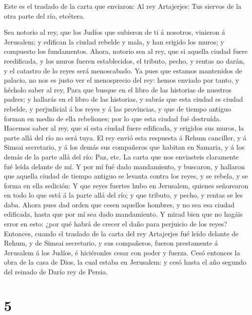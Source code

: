  Este es el traslado de la carta que enviaron: Al rey
Artajerjes: Tus siervos de la otra parte del río, etcétera.

 Sea notorio al rey, que los Judíos que subieron de ti á
nosotros, vinieron á Jerusalem; y edifican la ciudad rebelde y mala, y
han erigido los muros; y compuesto los fundamentos.  Ahora,
notorio sea al rey, que si aquella ciudad fuere reedificada, y los muros
fueren establecidos, el tributo, pecho, y rentas no darán, y el catastro
de lo reyes será menoscabado.  Ya pues que estamos
mantenidos de palacio, no nos es justo ver el menosprecio del rey: hemos
enviado por tanto, y hécholo saber al rey,  Para que busque
en el libro de las historias de nuestros padres; y hallarás en el libro
de las historias, y sabrás que esta ciudad es ciudad rebelde, y
perjudicial á los reyes y á las provincias, y que de tiempo antiguo
forman en medio de ella rebeliones; por lo que esta ciudad fué
destruída.  Hacemos saber al rey, que si esta ciudad fuere
edificada, y erigidos sus muros, la parte allá del río no será tuya.
 El rey envió esta respuesta á Rehum canciller, y á Simsai
secretario, y á los demás sus compañeros que habitan en Samaria, y á los
demás de la parte allá del río: Paz, etc.  La carta que nos
enviasteis claramente fué leída delante de mí.  Y por mí
fué dado mandamiento, y buscaron, y hallaron que aquella ciudad de
tiempo antiguo se levanta contra los reyes, y se rebela, y se forma en
ella sedición:  Y que reyes fuertes hubo en Jerusalem,
quienes señorearon en todo lo que está á la parte allá del río; y que
tributo, y pecho, y rentas se les daba.  Ahora pues dad
orden que cesen aquellos hombres, y no sea esa ciudad edificada, hasta
que por mí sea dado mandamiento.  Y mirad bien que no
hagáis error en esto: ¿por qué habrá de crecer el daño para perjuicio de
los reyes?  Entonces, cuando el traslado de la carta del
rey Artajerjes fué leído delante de Rehum, y de Simsai secretario, y sus
compañeros, fueron prestamente á Jerusalem á los Judíos, é hiciéronles
cesar con poder y fuerza.  Cesó entonces la obra de la casa
de Dios, la cual estaba en Jerusalem: y cesó hasta el año segundo del
reinado de Darío rey de Persia.

\hypertarget{section-4}{%
\section{5}\label{section-4}}

